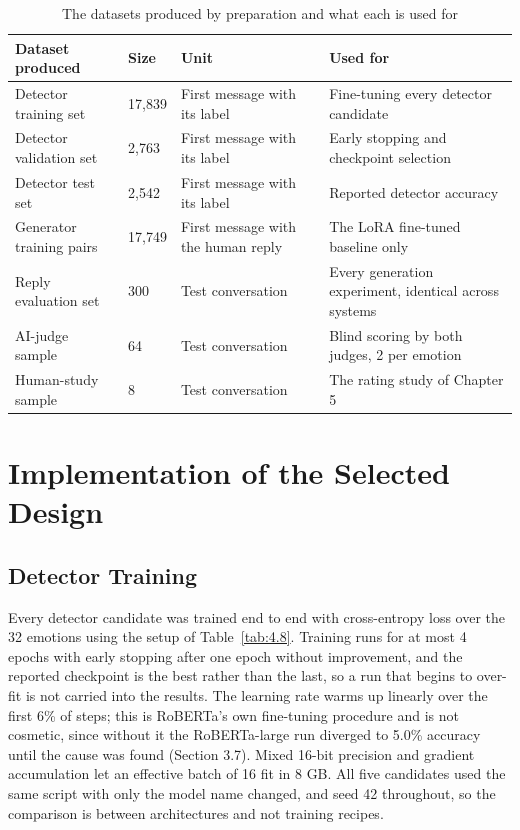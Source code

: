 \begin{table}[htbp]
\centering
\footnotesize
\begin{tabularx}{\textwidth}{@{}lXXX@{}}
\toprule
\textbf{Dataset produced} & \textbf{Size} & \textbf{Unit} & \textbf{Used for} \\
\midrule
Detector training set & 17,839 & First message with its label & Fine-tuning every detector candidate \\
Detector validation set & 2,763 & First message with its label & Early stopping and checkpoint selection \\
Detector test set & 2,542 & First message with its label & Reported detector accuracy \\
Generator training pairs & 17,749 & First message with the human reply & The LoRA fine-tuned baseline only \\
Reply evaluation set & 300 & Test conversation & Every generation experiment, identical across systems \\
AI-judge sample & 64 & Test conversation & Blind scoring by both judges, 2 per emotion \\
Human-study sample & 8 & Test conversation & The rating study of Chapter 5 \\
\bottomrule
\end{tabularx}
\caption{The datasets produced by preparation and what each is used for}
\label{tab:4.7}
\end{table}

\section{Implementation of the Selected Design}
\label{sec:4.4}

\subsection{Detector Training}

Every detector candidate was trained end to end with cross-entropy loss over the 32 emotions using the setup of Table~\ref{tab:4.8}. Training runs for at most 4 epochs with early stopping after one epoch without improvement, and the reported checkpoint is the best rather than the last, so a run that begins to over-fit is not carried into the results. The learning rate warms up linearly over the first 6\% of steps; this is RoBERTa's own fine-tuning procedure and is not cosmetic, since without it the RoBERTa-large run diverged to 5.0\% accuracy until the cause was found (Section 3.7). Mixed 16-bit precision and gradient accumulation let an effective batch of 16 fit in 8 GB. All five candidates used the same script with only the model name changed, and seed 42 throughout, so the comparison is between architectures and not training recipes.


